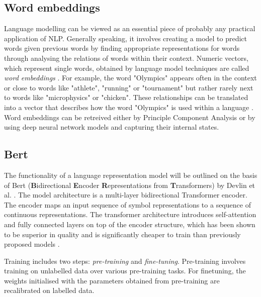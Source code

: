 \subsection{Word embeddings \label{sec:nlp_word_embeddings}}
Language modelling can be viewed as an essential piece of probably any practical application of NLP. Generally speaking, it involves creating a model to predict words given previous words by finding appropriate representations for words through analysing the relations of words within their context. Numeric vectors, which represent single words, obtained by language model techniques are called \textit{word embeddings} \cite{otter2020survey}. For example, the word "Olympics" appears often in the context or close to words like "athlete", "running" or "tournament" but rather rarely next to words like "microphysics" or "chicken". These relationships can be translated into a vector that describes how the word "Olympics" is used within a language \cite{mittechnologyreviewkingqueen}. Word embeddings can be retreived either by Principle Component Analysis or by using deep neural network models and capturing their internal states.
\subsection{Bert \label{Bert}}
The functionality of a language representation model will be outlined on the basis of Bert (\textbf{B}idirectional \textbf{E}ncoder \textbf{R}epresentations from \textbf{T}ransformers) by Devlin et al. \cite{devlin2018bert}. The model architecture is a multi-layer bidirectional Transformer encoder. The encoder maps an input sequence of symbol representations to a sequence of continuous representations. The transformer architecture introduces self-attention and fully connected layers on top of the encoder structure, which has been shown to be superior in quality and is significantly cheaper to train than previously proposed models \cite{vaswani2017attention}.

Training includes two steps: \textit{pre-training} and \textit{fine-tuning}. Pre-training involves training on unlabelled data over various pre-training tasks. For finetuning, the weights initialised with the parameters obtained from pre-training are recalibrated on labelled data.

